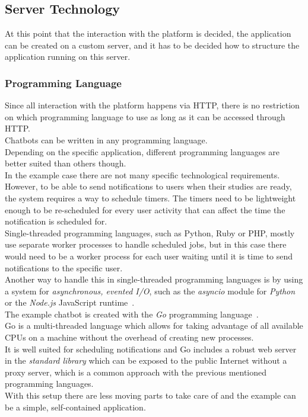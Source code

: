 \subsection{Server Technology}

At this point that the interaction with the platform is decided, the application can be created on a custom server,
and it has to be decided how to structure the application running on this server.


\subsubsection{Programming Language}

Since all interaction with the platform happens via HTTP,
there is no restriction on which programming language to use as long as it can be accessed through HTTP.
\\
Chatbots can be written in any programming language.
\\
Depending on the specific application, different programming languages are better suited than others though.
\\

In the example case there are not many specific technological requirements.
\\
However, to be able to send notifications to users when their studies are ready,
the system requires a way to schedule timers.
The timers need to be lightweight enough to be re-scheduled for every user activity
that can affect the time the notification is scheduled for.
\\
Single-threaded programming languages, such as Python, Ruby or PHP,
mostly use separate worker processes to handle scheduled jobs,
but in this case there would need to be a worker process for each user
waiting until it is time to send notifications to the specific user.
\\
Another way to handle this in single-threaded programming languages is by using a system for \emph{asynchronous, evented I/O},
such as the \emph{asyncio} module for \emph{Python}~\cite{asyncio} or the \emph{Node.js} JavaScript runtime~\cite{nodejs}.
\\

The example chatbot is created with the \emph{Go} programming language~\cite{golang}.
\\
Go is a multi-threaded language which allows for taking advantage of all available CPUs
on a machine without the overhead of creating new processes.
\\
It is well suited for scheduling notifications and Go includes a robust web server in the \emph{standard library} which can be exposed to the public Internet without a proxy server, which is a common approach with the previous mentioned programming languages.
\\
With this setup there are less moving parts to take care of and the example can be a simple, self-contained application.
\\


